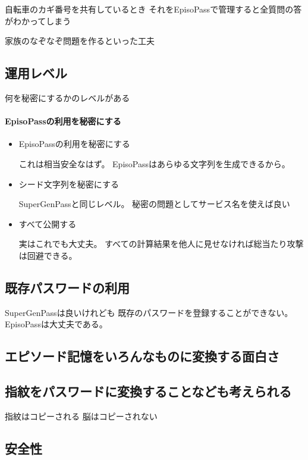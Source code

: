 \documentclass[twoside]{wiss}
\begin{document}
自転車のカギ番号を共有しているとき
それをEpisoPassで管理すると全質問の答がわかってしまう

家族のなぞなぞ問題を作るといった工夫

\subsection{運用レベル}

何を秘密にするかのレベルがある

\paragraph{EpisoPassの利用を秘密にする}

\begin{itemize}
\item EpisoPassの利用を秘密にする

これは相当安全なはず。
EpisoPassはあらゆる文字列を生成できるから。

\item シード文字列を秘密にする

SuperGenPassと同じレベル。
秘密の問題としてサービス名を使えば良い

\item すべて公開する

実はこれでも大丈夫。
すべての計算結果を他人に見せなければ総当たり攻撃は回避できる。

\end{itemize}

\subsection{既存パスワードの利用}

SuperGenPass\cite{SuperGenPass}は良いけれども
既存のパスワードを登録することができない。
EpisoPassは大丈夫である。

\subsection{エピソード記憶をいろんなものに変換する面白さ}

\subsection{指紋をパスワードに変換することなども考えられる}

指紋はコピーされる
脳はコピーされない

\subsection{安全性}
\end{document}

